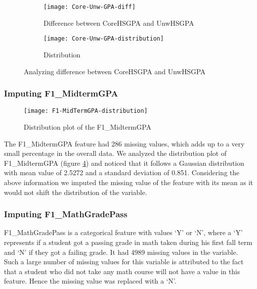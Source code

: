 \documentclass[11pt,openright]{report}
\begin{document}
\begin{figure}[!htbp]
\centering
    \begin{subfigure}[b]{0.55\textwidth}            
            \texttt{[image: Core-Unw-GPA-diff]}
            \caption{Difference between CoreHSGPA and UnwHSGPA}
            \label{fig:Core_Unw_diff}
    \end{subfigure}%
    \begin{subfigure}[b]{0.55\textwidth}
            \centering
            \texttt{[image: Core-Unw-GPA-distribution]}
            \caption{Distribution }
            \label{fig:Core_Unw_dist}
    \end{subfigure}
    \caption{Analyzing difference between CoreHSGPA and UnwHSGPA }\label{fig:diffHSGPA}
\end{figure}

\subsubsection {Imputing F1\_MidtermGPA}

\begin{figure}[!ht]
	\centering
	\texttt{[image: F1-MidTermGPA-distribution]}
	\caption{Distribution plot of the F1\_MidtermGPA}
	\label{fig:F1_MidtermGPA_plot}
\end{figure}

The F1\_MidtermGPA feature had 286 missing values, which adds up to a very small percentage in the overall data. We analyzed the distribution plot of F1\_MidtermGPA (figure \ref{fig:F1_MidtermGPA_plot}) and noticed that it follows a Gaussian distribution with mean value of 2.5272 and a standard deviation of 0.851. Considering the above information we imputed the missing value of the feature with its mean as it would not shift the distribution of the variable.

\subsubsection {Imputing F1\_MathGradePass}
F1\_MathGradePass is a categorical feature with values `Y' or `N', where a `Y' represents if a student got a passing grade in math taken during his first fall term and `N' if they got a failing grade. It had 4989 missing values in the variable. Such a large number of missing values for this variable is attributed to the fact that a student who did not take any math course will not have a value in this feature. Hence the missing value was replaced with a `N'.
\end{document}
